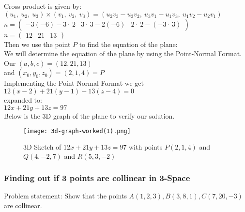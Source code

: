 Cross product is given by: \\

$\left(u_1,\:u_2,\:u_3\right)\times \left(v_1,\:v_2,\:v_3\right)=\left(u_2v_3-u_3v_2,\:u_3v_1-u_1v_3,\:u_1v_2-u_2v_1\right)$ \\

$n = \begin{pmatrix}-3\left(-6\right)-3\cdot \:2&3\cdot \:3-2\left(-6\right)&2\cdot \:2-\left(-3\cdot \:3\right)\end{pmatrix}$ \\

$n = \begin{pmatrix}12&21&13\end{pmatrix}$ \\ 

Then we use the point $P$ to find the equation of the plane: \\

We will determine the equation of the plane by using the Point-Normal Format. \\

Our $(a,b,c) = (12,21,13)$ \\ 

and $(x_0,y_0,z_0) = (2,1,4) = P$ \\

Implementing the Point-Normal Format we get \\

$ 12(x-2)+21(y-1)+13(z-4)= 0 $ \\ 

expanded to: \\

$ 12x+21y+13z = 97$ \\

Below is the 3D graph of the plane to verify our solution.

\begin{figure}[H]
\centering
\texttt{[image: 3d-graph-worked(1).png]}
\caption{3D Sketch of $12x+21y+13z = 97$ with points $P(2,1,4)$ and $Q(4,-2,7)$ and $R(5,3,-2)$}
\label{fig:Plane_3D_worked_1}
\end{figure}



\subsubsection{Finding out if 3 points are collinear in 3-Space}
Problem statement: Show that the points $A(1,2,3) , B(3,8,1), C(7,20,-3)$ are collinear. \\

